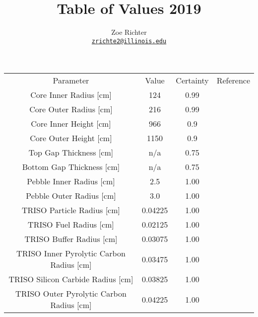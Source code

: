 \documentclass[letterpaper]{article}
\author{Zoe Richter
        \\ \href{mailto:zrichte2@illinois.edu}{\texttt{zrichte2@illinois.edu}}
}
\title{Table of Values 2019}
\begin{document}
\maketitle



\begin{adjustbox}{max width=\textwidth}
\centering
 \begin{tabular}{c c c c}
 Parameter & Value & Certainty & Reference  \\

 Core Inner Radius [cm] & 124  & 0.99 & \cite{harlan_x-energy_2018} \\

 Core Outer Radius [cm]  & 216 & 0.99  & \cite{harlan_x-energy_2018} \\

 Core Inner Height [cm] & 966 & 0.9 & \cite{harlan_x-energy_2018}  \\

 Core Outer Height [cm] & 1150 & 0.9 & \cite{harlan_x-energy_2018}   \\

 Top Gap Thickness [cm] & n/a & 0.75  & \cite{harlan_x-energy_2018}  \\

 Bottom Gap Thickness [cm] & n/a & 0.75 & \cite{harlan_x-energy_2018}  \\

 Pebble Inner Radius [cm] & 2.5 & 1.00 & \cite{harlan_x-energy_2018}  \\

 Pebble Outer Radius [cm] & 3.0 & 1.00 & \cite{harlan_x-energy_2018}   \\

  TRISO Particle Radius [cm] & 0.04225 & 1.00 & \cite{harlan_x-energy_2018} \\

 TRISO Fuel Radius [cm] & 0.02125 & 1.00 & \cite{harlan_x-energy_2018}   \\

 TRISO Buffer Radius [cm] & 0.03075 & 1.00 & \cite{harlan_x-energy_2018}   \\

 TRISO Inner Pyrolytic Carbon Radius [cm] & 0.03475 & 1.00 & \cite{harlan_x-energy_2018}   \\

 TRISO Silicon Carbide Radius [cm] & 0.03825 & 1.00 & \cite{harlan_x-energy_2018}   \\

 TRISO Outer Pyrolytic Carbon Radius [cm]  & 0.04225 & 1.00 & \cite{harlan_x-energy_2018}  \\


\end{tabular}
\end{adjustbox}
\end{document}
